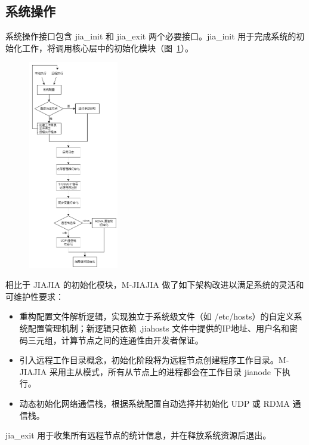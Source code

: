 {\subsection{系统操作}\label{sec:init}
系统操作接口包含 jia\_init 和 jia\_exit 两个必要接口。jia\_init 用于完成系统的初始化工作，将调用核心层中的初始化模块（图~\ref{fig:mjiajia-init}）。
\begin{figure}[!htbp]
    \centering
    \includegraphics[width=0.35\textwidth]{Img/M-JIAJIA-init.png}
    \label{fig:mjiajia-init}
\end{figure}
相比于 JIAJIA 的初始化模块，M-JIAJIA 做了如下架构改进以满足系统的灵活和可维护性要求：
\begin{itemize}
    \item 重构配置文件解析逻辑，实现独立于系统级文件（如 /etc/hosts）的自定义系统配置管理机制；新逻辑只依赖 .jiahosts 文件中提供的IP地址、用户名和密码三元组，计算节点之间的连通性由开发者保证。
    \item 引入远程工作目录概念，初始化阶段将为远程节点创建程序工作目录。M-JIAJIA 采用主从模式，所有从节点上的进程都会在工作目录 jianode 下执行。
    \item 动态初始化网络通信栈，根据系统配置自动选择并初始化 UDP 或 RDMA 通信栈。
\end{itemize}

jia\_exit 用于收集所有远程节点的统计信息，并在释放系统资源后退出。
}

